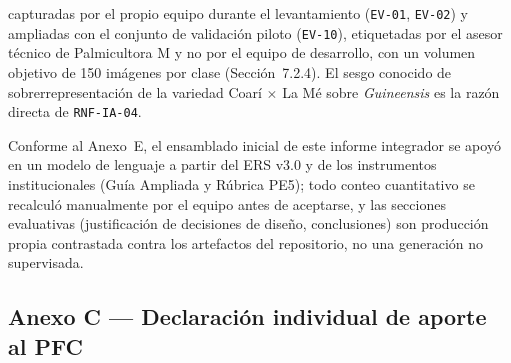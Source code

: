 \documentclass[11pt,a4paper]{article}
\newcommand{\id}[1]{\texttt{#1}}
\begin{document}
\begin{description}[leftmargin=1.2cm,style=nextline]
capturadas por el propio equipo durante el levantamiento (\id{EV-01}, \id{EV-02}) y ampliadas con
el conjunto de validación piloto (\id{EV-10}), etiquetadas por el asesor técnico de Palmicultora M
y no por el equipo de desarrollo, con un volumen objetivo de 150 imágenes por clase (Sección~7.2.4).
El sesgo conocido de sobrerrepresentación de la variedad Coarí $\times$ La Mé sobre
\emph{Guineensis} es la razón directa de \id{RNF-IA-04}.
\item[P22 --- ¿Qué secciones de este informe se redactaron con asistencia de IA y cómo se
validaron?] Conforme al Anexo~E, el ensamblado inicial de este informe integrador se apoyó en un
modelo de lenguaje a partir del ERS v3.0 y de los instrumentos institucionales (Guía Ampliada y
Rúbrica PE5); todo conteo cuantitativo se recalculó manualmente por el equipo antes de aceptarse, y
las secciones evaluativas (justificación de decisiones de diseño, conclusiones) son producción
propia contrastada contra los artefactos del repositorio, no una generación no supervisada.
\end{description}

\subsection*{Anexo C --- Declaración individual de aporte al PFC}
\end{document}
